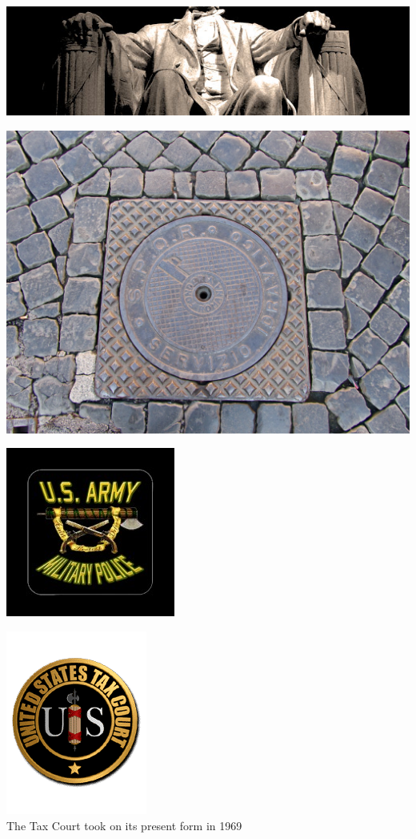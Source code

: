 \begin{frame}
    \centering
    \includegraphics[width=.9\textwidth]{img/fasces/lincoln_fasces.jpg} \\
\end{frame}
\begin{frame}
    \centering
    \includegraphics[width=.9\textwidth]{img/fasces/manhole.JPG} \\
\end{frame}
\begin{frame}
    \centering
    \includegraphics[height=.8\textheight]{img/fasces/mp.jpg} \\
\end{frame}
\begin{frame}
    \centering
    \includegraphics[height=.8\textheight]{img/fasces/tax-court.png} \\
    The Tax Court took on its present form in 1969 \\
\end{frame}
